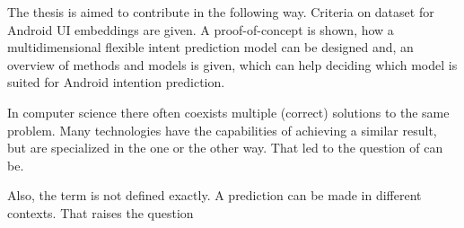 
The thesis is aimed to contribute in the following way.
Criteria on dataset for Android UI embeddings are given.
A proof-of-concept is shown, how a multidimensional flexible intent prediction model can be designed and,
an overview of methods and models is given, which can help deciding which model is suited for Android intention prediction.

In computer science there often coexists multiple (correct) solutions to the same problem.
Many technologies have the capabilities of achieving a similar result, but are specialized in the one or the other way.
That led to the question of  can be.

Also, the term  is not defined exactly.
A prediction can be made in different contexts.
That raises the question 


%
%
%

